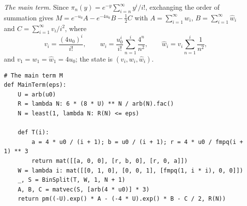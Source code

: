 \documentclass[11pt,reqno]{amsart}
\theoremstyle{definition}
\theoremstyle{remark}
\begin{document}
\emph{The main term.} Since $\pi_n(y) = e^{-y}\sum_{i=n}^{\infty}y^i/i!$, exchanging the order of summation gives
$M = e^{-u_0}A - e^{-4u_0}B - \frac12C$ with $A = \sum_{i=1}^{\infty}w_i$, $B = \sum_{i=1}^{\infty}\hat w_i$ and
$C = \sum_{i=1}^{\infty}v_i/i^2$, where
\[
  v_i = \frac{(4u_0)^i}{i!}, \qquad w_i = \frac{u_0^i}{i!}\sum_{n=1}^{i}\frac{4^n}{n^2}, \qquad
  \hat w_i = v_i\sum_{n=1}^{i}\frac1{n^2},
\]
and $v_1 = w_1 = \hat w_1 = 4u_0$; the state is $(v_i, w_i, \hat w_i)$.
\begin{lstlisting}[style=ref, firstnumber=70]
# The main term M
def MainTerm(eps):
    U = arb(u0)
    R = lambda N: 6 * (8 * U) ** N / arb(N).fac()
    N = least(1, lambda N: R(N) <= eps)

    def T(i):
        a = 4 * u0 / (i + 1); b = u0 / (i + 1); r = 4 * u0 / fmpq(i + 1) ** 3
        return mat([[a, 0, 0], [r, b, 0], [r, 0, a]])
    W = lambda i: mat([[0, 1, 0], [0, 0, 1], [fmpq(1, i * i), 0, 0]])
    _, S = BinSplit(T, W, 1, N + 1)
    A, B, C = matvec(S, [arb(4 * u0)] * 3)
    return pm((-U).exp() * A - (-4 * U).exp() * B - C / 2, R(N))
\end{lstlisting}
\end{document}
